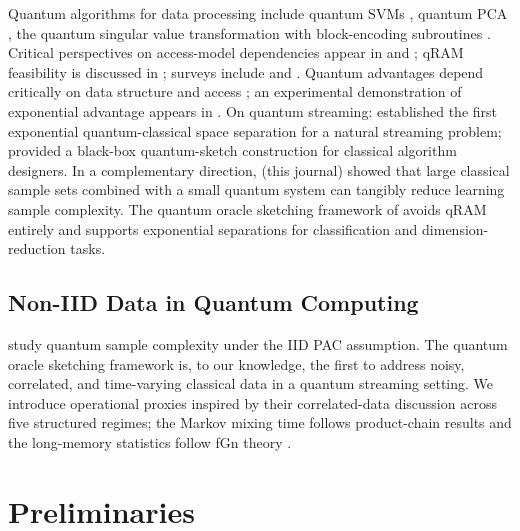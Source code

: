 \documentclass[preprint,12pt,authoryear]{elsarticle}
\begin{document}
Quantum algorithms for data processing include quantum SVMs \citep{rebentrost2014quantum}, quantum PCA \citep{lloyd2014quantum}, the quantum singular value transformation \citep{gilyen2019qsvt} with block-encoding subroutines \citep{chakraborty2019blockencodings}. Critical perspectives on access-model dependencies appear in \citet{aaronson2015readthefineprint} and \citet{tang2019quantum}; qRAM feasibility is discussed in \citet{giovannetti2008quantum}; surveys include \citet{chen2024qmlsurvey} and \citet{schuld2018supervised}. Quantum advantages depend critically on data structure and access \citep{huang2021powerofdata}; an experimental demonstration of exponential advantage appears in \citet{huang2022experiments}. On quantum streaming: \citet{kallaugher2021streaming} established the first exponential quantum-classical space separation for a natural streaming problem; \citet{kallaugher2025designquantum} provided a black-box quantum-sketch construction for classical algorithm designers. In a complementary direction, \citet{song2021tangible} (this journal) showed that large classical sample sets combined with a small quantum system can tangibly reduce learning sample complexity. The quantum oracle sketching framework of \citet{zhao2026exponential} avoids qRAM entirely and supports exponential separations for classification and dimension-reduction tasks.

\subsection{Non-IID Data in Quantum Computing}

\citet{arunachalam2018optimal} study quantum sample complexity under the IID PAC assumption. The quantum oracle sketching framework \citep{zhao2026exponential} is, to our knowledge, the first to address noisy, correlated, and time-varying classical data in a quantum streaming setting. We introduce operational proxies inspired by their correlated-data discussion across five structured regimes; the Markov mixing time follows product-chain results \citep{levin2017mixing} and the long-memory statistics follow fGn theory \citep{mandelbrot1968fbm, beran1994statistics}.


\section{Preliminaries}
\label{sec:prelim}
\end{document}
